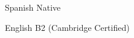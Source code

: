 
\begin{cvskills}

  \cvskill
    {Spanish} %
    {Native} %

  \cvskill
    {English} %
    {B2 (Cambridge Certified)} %

\end{cvskills}
